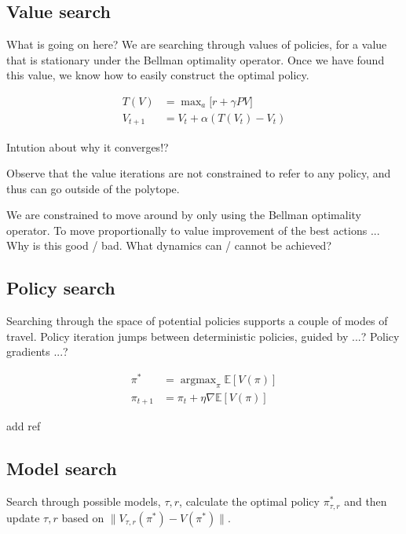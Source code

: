 \subsection{Value search}

What is going on here? We are searching through values of policies, for a value that is
stationary under the Bellman optimality operator. Once we have found this value,
we know how to easily construct the optimal policy.

\begin{align}
T(V) &= \mathop{\text{max}}_a \big[r + \gamma PV\big] \\
V_{t+1} &= V_t + \alpha (T(V_t) - V_t)
\end{align}

Intution about why it converges!?


Observe that the value iterations are not constrained to refer to any policy,
and thus can go outside of the polytope. \cite{Dadashi2018}

We are constrained to move around by only using the Bellman optimality operator.
To move proportionally to value improvement of the best actions ...
Why is this good / bad. What dynamics can / cannot be achieved?

\subsection{Policy search}

Searching through the space of potential policies supports a couple of modes of travel.
Policy iteration jumps between deterministic policies, guided by ...?
Policy gradients ...?

\begin{align}
\pi^{* } &= \mathop{\text{argmax}}_{\pi} \mathbb E [V(\pi)] \\
\pi_{t+1} &= \pi_t + \eta \nabla \mathbb E [V(\pi)]
\end{align}

add ref


\subsection{Model search}

Search through possible models, \(\tau, r\), calculate the optimal
policy \(\pi^{* }_{\tau, r}\) and then update \(\tau, r\) based on
\(\parallel V_{\tau, r}(\pi^{* }) - V(\pi^{* }) \parallel\).

